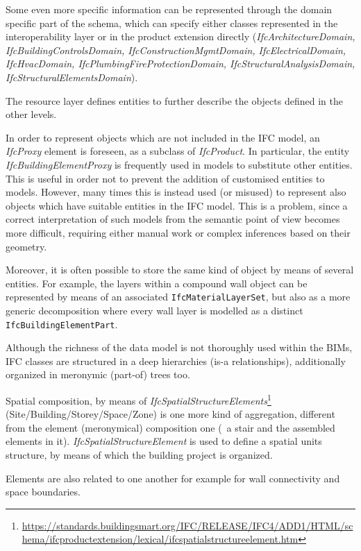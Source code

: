 Some even more specific information can be represented through the domain specific part of the schema, which can specify either classes represented in the interoperability layer or in the product extension directly (\textit{IfcArchitectureDomain, IfcBuildingControlsDomain, IfcConstructionMgmtDomain, IfcElectricalDomain, IfcHvacDomain, IfcPlumbingFireProtectionDomain, IfcStructuralAnalysisDomain, IfcStructuralElementsDomain}).

The resource layer defines entities to further describe the objects defined in the other levels.

In order to represent objects which are not included in the IFC model, an \textit{IfcProxy} element is foreseen, as a subclass of \textit{IfcProduct}.
In particular, the entity \textit{IfcBuildingElementProxy} is frequently used in models to substitute other entities.
This is useful in order not to prevent the addition of customised entities to models. However, many times this is instead used (or misused) to represent also objects which have suitable entities in the IFC model.
This is a problem, since a correct interpretation of such models from the semantic point of view becomes more difficult, requiring either manual work or complex inferences based on their geometry.

Moreover, it is often possible to store the same kind of object by means of several entities.
For example, the layers within a compound wall object can be represented by means of an associated \texttt{IfcMaterialLayerSet}, but also as a more generic decomposition where every wall layer is modelled as a distinct \texttt{IfcBuildingElementPart}.

Although the richness of the data model is not thoroughly used within the BIMs,
IFC classes are structured in a deep hierarchies (is-a relationships), additionally organized in
meronymic (part-of) trees too.

Spatial composition, by means of \textit{IfcSpatialStructureElements}\footnote{\url{https://standards.buildingsmart.org/IFC/RELEASE/IFC4/ADD1/HTML/schema/ifcproductextension/lexical/ifcspatialstructureelement.htm}} (Site/Building/Storey/Space/Zone) is one more kind of aggregation, different from the element (meronymical) composition one (\eg\ a stair and the assembled elements in it).
\textit{IfcSpatialStructureElement} is used to define a spatial units structure, by means of which the building project is organized.

Elements are also related to one another for example for wall connectivity and space boundaries.

